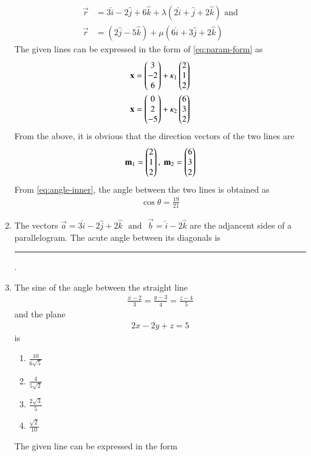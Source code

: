 \begin{enumerate}[label=\thesubsection.\arabic*, ref=\thesubsection.\theenumi]
\begin{align}
	\overrightarrow{r}&=3\hat{i}-2\hat{j}+6\hat{k}+\lambda(2\hat{i}+\hat{j}+2\hat{k})
	\text{ and}
	\\
	\overrightarrow{r}&=(2\hat{j}-5\hat{k})+\mu(6\hat{i}+3\hat{j}+2\hat{k})
\end{align}
%
\solution  The given lines can be expressed  in the form 
of 
	\eqref{eq:param-form}
	as
\begin{align}
	\mathbf{x} = \begin{pmatrix}3 \\ -2 \\ 6\end{pmatrix} + \kappa_1 \begin{pmatrix}2 \\ 1 \\ 2\end{pmatrix}
	\\
	\mathbf{x} = \begin{pmatrix}0 \\ 2 \\ -5 \end{pmatrix} + \kappa_2 \begin{pmatrix}6 \\ 3 \\ 2\end{pmatrix}
\end{align}
From the above,  it is obvious that the direction vectors of the two lines are
\begin{align}
\mathbf{m}_1 =\begin{pmatrix}2 \\ 1 \\ 2\end{pmatrix}, \
	\mathbf{m}_2=\begin{pmatrix}6 \\ 3 \\ 2\end{pmatrix}
\end{align}
	From \eqref{eq:angle-inner},  the angle between the two lines is  obtained as
\begin{align}
	\cos \theta = \frac{19}{21}
\end{align}
\item The vectors $\vec{a}=3\hat{i}-2\hat{j}+2\hat{k}$ $\text{ and }$ $\vec{b}=\hat{i}-2\hat{k}$ are the adjancent sides of a parallelogram. The acute angle between its diagonals is \rule{1cm}{0.15mm}.
\item The sine of the angle between the straight line 
\begin{align}
	\frac{x-2}{3}=\frac{y-3}{4}=\frac{z-4}{5} 
\end{align}
and the plane  
\begin{align}
2x-2y+z=5
\end{align}
is
\begin{enumerate}
	\item $\frac{10}{6\sqrt{5}}$ 
	\item $\frac{4}{5\sqrt{2}}$
	\item $\frac{2\sqrt{3}}{5}$
	\item $\frac{\sqrt{2}}{10}$
\end{enumerate}
\solution The given line can be expressed in the form 

\end{enumerate}
